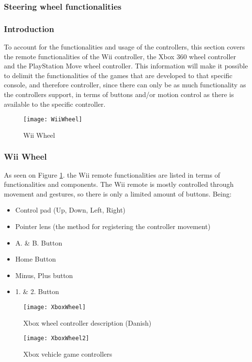 \subsubsection{Steering wheel functionalities}
\subsubsection*{Introduction}
To account for the functionalities and usage of the controllers, this section covers the remote functionalities of the Wii controller, the Xbox 360 wheel controller and the PlayStation Move wheel controller. This information will make it possible to delimit the functionalities of the games that are developed to that specific console, and therefore controller, since there can only be as much functionality as the controllers support, in terms of buttons and/or motion control as there is available to the specific controller.

\begin{figure}[h] 
\centering
\texttt{[image: WiiWheel]} 
\caption{Wii Wheel}
\label{fig:Wiimote}
\end{figure}
\bigskip

\subsubsection*{Wii Wheel}
\parencite{Nintendo2013}\newline
As seen on Figure \ref{fig:Wiimote}. the Wii remote functionalities are listed in terms of functionalities and components. The Wii remote is mostly controlled through movement and gestures, so there is only a limited amount of buttons. Being:
\begin{itemize}
\item Control pad (Up, Down, Left, Right)
\item Pointer lens (the method for registering the controller movement)
\item A. \& B. Button
\item Home Button
\item Minus, Plus button
\item 1. \& 2. Button
\end{itemize}
\bigskip

\begin{figure}[h] 
\centering
\caption{Xbox wheel controller description (Danish)}
\label{fig:XboxWheel}
\texttt{[image: XboxWheel]} 
\end{figure}
\begin{figure}[h]
\centering
\texttt{[image: XboxWheel2]}
\caption{Xbox vehicle game controllers}
\label{fig:XboxWheel2}
\end{figure}

